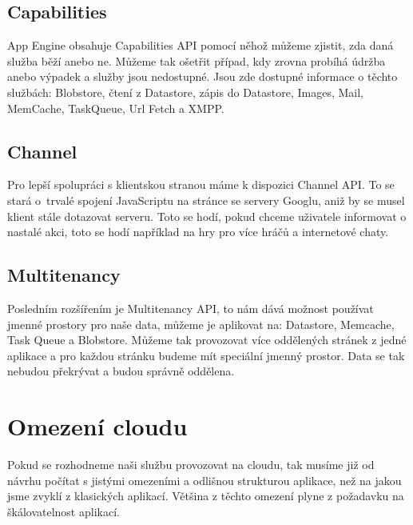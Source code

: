 \subsection{Capabilities}
App Engine obsahuje Capabilities API pomocí něhož můžeme zjistit, zda daná služba běží anebo ne. Můžeme tak ošetřit případ, kdy zrovna probíhá údržba anebo výpadek a služby jsou nedostupné. Jsou zde dostupné informace o těchto službách: Blobstore, čtení z Datastore, zápis do Datastore, Images, Mail, MemCache, TaskQueue, Url Fetch a XMPP.

\subsection{Channel}
Pro lepší spolupráci s klientskou stranou máme k dispozici Channel API. To se stará o~trvalé spojení JavaScriptu na stránce se servery Googlu, aniž by se musel klient stále dotazovat serveru. Toto se hodí, pokud chceme uživatele informovat o nastalé akci, toto se hodí například na hry pro více hráčů a internetové chaty.

\subsection{Multitenancy}
Posledním rozšířením je Multitenancy API, to nám dává možnost používat jmenné prostory pro naše data, můžeme je aplikovat na: Datastore, Memcache, Task Queue a Blobstore. Můžeme tak provozovat více oddělených stránek z jedné aplikace a pro každou stránku budeme mít speciální jmenný prostor. Data se tak nebudou překrývat a budou správně oddělena.

\section{Omezení cloudu}
Pokud se rozhodneme naši službu provozovat na cloudu, tak musíme již od návrhu počítat s jistými omezeními a odlišnou strukturou aplikace, než na jakou jsme zvyklí z klasických aplikací. Většina z těchto omezení plyne z požadavku na škálovatelnost aplikací.

